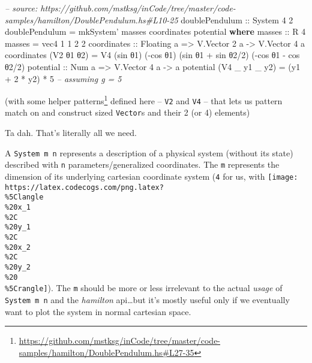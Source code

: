 \documentclass[]{article}
\newenvironment{Shaded}{}{}
\newcommand{\KeywordTok}[1]{\textcolor[rgb]{0.00,0.44,0.13}{\textbf{#1}}}
\newcommand{\DataTypeTok}[1]{\textcolor[rgb]{0.56,0.13,0.00}{#1}}
\newcommand{\DecValTok}[1]{\textcolor[rgb]{0.25,0.63,0.44}{#1}}
\newcommand{\CommentTok}[1]{\textcolor[rgb]{0.38,0.63,0.69}{\textit{#1}}}
\newcommand{\OtherTok}[1]{\textcolor[rgb]{0.00,0.44,0.13}{#1}}
\newcommand{\FunctionTok}[1]{\textcolor[rgb]{0.02,0.16,0.49}{#1}}
\newcommand{\NormalTok}[1]{#1}
\renewcommand{\href}[2]{#2\footnote{\url{#1}}}
\begin{document}
\begin{Shaded}
\begin{Highlighting}[]
\CommentTok{-- source: https://github.com/mstksg/inCode/tree/master/code-samples/hamilton/DoublePendulum.hs#L10-25}
\OtherTok{doublePendulum ::} \DataTypeTok{System} \DecValTok{4} \DecValTok{2}
\NormalTok{doublePendulum }\FunctionTok{=}\NormalTok{ mkSystem' masses coordinates potential}
  \KeywordTok{where}
\OtherTok{    masses ::} \DataTypeTok{R} \DecValTok{4}
\NormalTok{    masses }\FunctionTok{=}\NormalTok{ vec4 }\DecValTok{1} \DecValTok{1} \DecValTok{2} \DecValTok{2}
\NormalTok{    coordinates}
\OtherTok{        ::} \DataTypeTok{Floating}\NormalTok{ a}
        \OtherTok{=>} \DataTypeTok{V.Vector} \DecValTok{2}\NormalTok{ a}
        \OtherTok{->} \DataTypeTok{V.Vector} \DecValTok{4}\NormalTok{ a}
\NormalTok{    coordinates (}\DataTypeTok{V2}\NormalTok{ θ1 θ2) }\FunctionTok{=} \DataTypeTok{V4}\NormalTok{ (sin θ1)            (}\FunctionTok{-}\NormalTok{cos θ1)}
\NormalTok{                                (sin θ1 }\FunctionTok{+}\NormalTok{ sin θ2}\FunctionTok{/}\DecValTok{2}\NormalTok{) (}\FunctionTok{-}\NormalTok{cos θ1 }\FunctionTok{-}\NormalTok{ cos θ2}\FunctionTok{/}\DecValTok{2}\NormalTok{)}
\NormalTok{    potential}
\OtherTok{        ::} \DataTypeTok{Num}\NormalTok{ a}
        \OtherTok{=>} \DataTypeTok{V.Vector} \DecValTok{4}\NormalTok{ a}
        \OtherTok{->}\NormalTok{ a}
\NormalTok{    potential (}\DataTypeTok{V4}\NormalTok{ _ y1 _ y2) }\FunctionTok{=}\NormalTok{ (y1 }\FunctionTok{+} \DecValTok{2} \FunctionTok{*}\NormalTok{ y2) }\FunctionTok{*} \DecValTok{5}    \CommentTok{-- assuming g = 5}
\end{Highlighting}
\end{Shaded}

(with some
\href{https://github.com/mstksg/inCode/tree/master/code-samples/hamilton/DoublePendulum.hs\#L27-35}{helper
patterns} defined here -- \texttt{V2} and \texttt{V4} -- that lets us pattern
match on and construct sized \texttt{Vector}s and their 2 (or 4) elements)

Ta dah. That's literally all we need.

A \texttt{System\ m\ n} represents a description of a physical system (without
its state) described with \texttt{n} parameters/generalized coordinates. The
\texttt{m} represents the dimension of its underlying cartesian coordinate
system (\texttt{4} for us, with
\texttt{[image: https://latex.codecogs.com/png.latex?\\\%5Clangle\\\%20x\_1\\\%2C\\\%20y\_1\\\%2C\\\%20x\_2\\\%2C\\\%20y\_2\\\%20\\\%5Crangle]}).
The \texttt{m} should be more or less irrelevant to the actual \emph{usage} of
\texttt{System\ m\ n} and the \emph{hamilton} api\ldots{}but it's mostly useful
only if we eventually want to plot the system in normal cartesian space.
\end{document}

